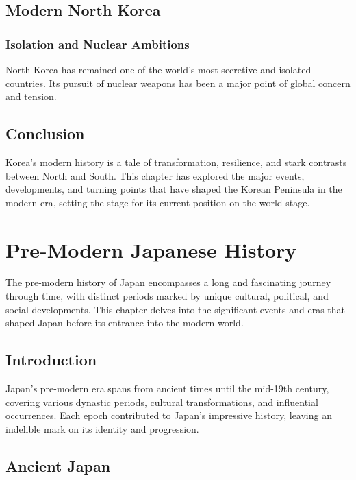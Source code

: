 \documentclass[a4paper,12pt]{book}
\begin{document}
\section{Modern North Korea}
\label{sec:modern-north-korea}

\subsection{Isolation and Nuclear Ambitions}
\label{subsec:isolation-nuclear-ambitions}
North Korea has remained one of the world’s most secretive and isolated countries. Its pursuit of nuclear weapons has been a major point of global concern and tension.

\section{Conclusion}
\label{sec:conclusion-modern-korea}
Korea’s modern history is a tale of transformation, resilience, and stark contrasts between North and South. This chapter has explored the major events, developments, and turning points that have shaped the Korean Peninsula in the modern era, setting the stage for its current position on the world stage.

\chapter{Pre-Modern Japanese History}
\label{ch:pre-modern-japanese-history}

The pre-modern history of Japan encompasses a long and fascinating journey through time, with distinct periods marked by unique cultural, political, and social developments. This chapter delves into the significant events and eras that shaped Japan before its entrance into the modern world.

\section{Introduction}
\label{sec:introduction-pre-modern-japan}
Japan's pre-modern era spans from ancient times until the mid-19th century, covering various dynastic periods, cultural transformations, and influential occurrences. Each epoch contributed to Japan's impressive history, leaving an indelible mark on its identity and progression.

\section{Ancient Japan}
\label{sec:ancient-japan}
\end{document}
